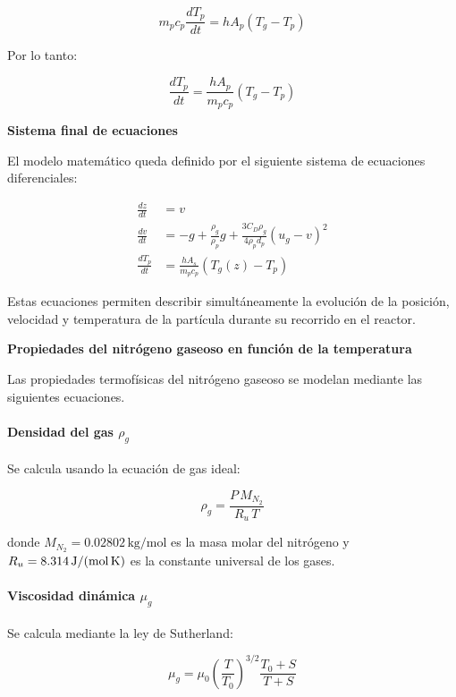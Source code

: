 \documentclass[11pt,stdletter,orderfromtodate,sigleft,twoside]{report}
\begin{document}
\begin{equation}  
    m_p c_p \frac{dT_p}{dt} = h A_p (T_g - T_p)
    \label{eq:10}
\end{equation}

Por lo tanto:

\begin{equation}  
    \frac{dT_p}{dt} =
\frac{h A_p}{m_p c_p}(T_g - T_p)
    \label{eq:11}
\end{equation}
\medskip

\textbf{Sistema final de ecuaciones} 

El modelo matemático queda definido por el siguiente sistema de ecuaciones diferenciales:

\begin{equation}
\begin{aligned}
\frac{dz}{dt} &= v \\
\frac{dv}{dt} &= -g + \frac{\rho_g}{\rho_p}g 
+ \frac{3C_D\rho_g}{4\rho_p d_p}(u_g - v)^2 \\
\frac{dT_p}{dt} &= \frac{hA_s}{m_p c_p}\left(T_g(z) - T_p\right)
\end{aligned}
\label{eq:sistema_final}
\end{equation}

Estas ecuaciones permiten describir simultáneamente la evolución de la posición, velocidad y temperatura de la partícula durante su recorrido en el reactor.
\medskip

\textbf{Propiedades del nitrógeno gaseoso en función de la temperatura}

Las propiedades termofísicas del nitrógeno gaseoso se modelan mediante las siguientes ecuaciones.

\paragraph{Densidad del gas $\rho_g$}
Se calcula usando la ecuación de gas ideal:

\[
\rho_g = \frac{P\,M_{N_2}}{R_u\,T}
\]

donde $M_{N_2}=0.02802\,\text{kg/mol}$ es la masa molar del nitrógeno y
$R_u=8.314\,\text{J/(mol\,K)}$ es la constante universal de los gases.

\paragraph{Viscosidad dinámica $\mu_g$}
Se calcula mediante la ley de Sutherland:

\[
\mu_g = \mu_0\left(\frac{T}{T_0}\right)^{3/2}\frac{T_0+S}{T+S}
\]
\end{document}
